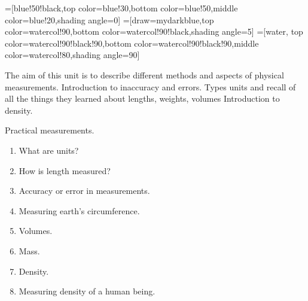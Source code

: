 \documentclass[11pt]{article}
\begin{document}
\tikzset{>=latex}
\contourlength{1.1pt}

=[blue!50!black,top color=blue!30,bottom color=blue!50,middle color=blue!20,shading angle=0]
=[draw=mydarkblue,top color=watercol!90,bottom color=watercol!90!black,shading angle=5]
=[water,
  top color=watercol!90!black!90,bottom color=watercol!90!black!90,middle color=watercol!80,shading angle=90]
\def\tick#1#2{\draw[thick] (#1)++(#2:0.1) --++ (#2-180:0.2)}



The aim of this unit is to describe different methods and aspects of physical measurements.
Introduction to inaccuracy and errors. Types units and recall of all the things they learned about lengths, weights, volumes
Introduction to density.

Practical measurements.


\begin{enumerate}
\item What are units?
\item How is length measured?
\item Accuracy or error in measurements.
\item Measuring earth's circumference.
\item Volumes.
\item Mass.
\item Density.
\item Measuring density of a human being.
\end{enumerate}
\end{document}
